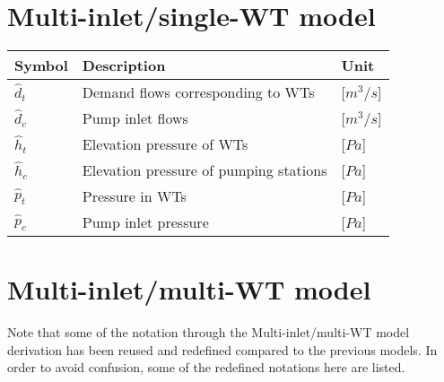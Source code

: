 \section*{Multi-inlet/single-WT model}

\begin{tabular}{l l l} 
	\textbf{Symbol}		&	\textbf{Description}							& \hspace{42mm}\textbf{Unit}			\\\hline						
	$\hat{d}_t$			&	Demand flows corresponding to WTs			    & \hspace{42mm}[$m^3/s$]\\
	$\hat{d}_c$			&	Pump inlet flows								& \hspace{42mm}[$m^3/s$]\\
	$\hat{h}_t$			&	Elevation pressure of WTs		    			& \hspace{42mm}[$Pa$]\\
	$\hat{h}_c$			&	Elevation pressure of pumping stations			& \hspace{42mm}[$Pa$]\\
	$\hat{p}_t$			&	Pressure in WTs				    				& \hspace{42mm}[$Pa$]\\
	$\hat{p}_c$			&	Pump inlet pressure								& \hspace{42mm}[$Pa$]\\
\end{tabular}

\section*{Multi-inlet/multi-WT model}

Note that some of the notation through the Multi-inlet/multi-WT model derivation has been reused and redefined compared to the previous models. In order to avoid confusion, some of the redefined notations here are listed. 

